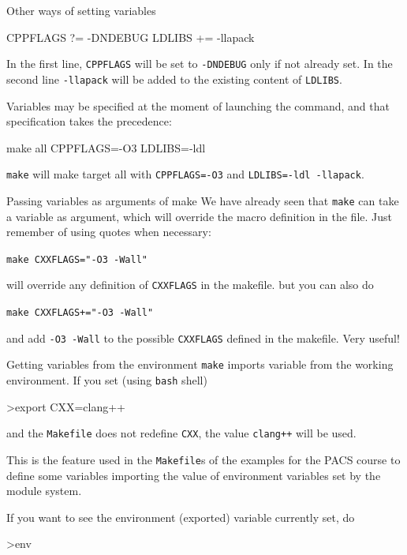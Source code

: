 \documentclass[10pt,aspectratio=169]{beamer}
\begin{document}
\begin{frame}{Other ways of setting variables}
	
	\begin{semiverbatim}
		CPPFLAGS ?= -DNDEBUG\newline
		LDLIBS += -llapack
	\end{semiverbatim}
In the first line, \texttt{CPPFLAGS} will be set to \texttt{-DNDEBUG} only if \alert{not already set}.
In the second line \texttt{-llapack} will be added to the existing content of \texttt{LDLIBS}.
\medskip

Variables may be specified at the moment of launching the command, and that specification takes the precedence:
\begin{semiverbatim}
	make all CPPFLAGS=-O3 LDLIBS=-ldl
\end{semiverbatim}
\texttt{make} will make target \alert{all} with  \texttt{CPPFLAGS=-O3} and \texttt{LDLIBS=-ldl -llapack}.
\end{frame}

\begin{frame}{Passing variables as arguments of make}
    We have already seen that \texttt{make} can take a variable as argument, which will override the macro
    definition in the file.  Just remember of using quotes when necessary:
    
    \begin{center}
        \texttt{make CXXFLAGS="-O3 -Wall"} 
    \end{center}
    will override any definition of \texttt{CXXFLAGS} in the makefile.
    \medskip
    but you can also do
    \begin{center}
        \texttt{make CXXFLAGS+="-O3 -Wall"} 
    \end{center}
    and add \texttt{-O3 -Wall} to the possible \texttt{CXXFLAGS} defined in the makefile.
    \alert{Very useful!}
  \end{frame}


\begin{frame}{Getting variables from the environment}
\texttt{make} imports variable from the working environment. If you set (using \texttt{bash} shell)
\begin{semiverbatim}
    >export CXX=clang++
\end{semiverbatim}
and the \texttt{Makefile} does not redefine \texttt{CXX}, the value \texttt{clang++} will be used.
\smallskip

This is the feature used  in the \texttt{Makefile}s of the examples
for the PACS course to define some variables importing the value of environment variables set by the module system.
\smallskip

If you want to see the environment (exported) variable currently set, do
\begin{semiverbatim}
    >env
\end{semiverbatim}
    
    \end{frame}
\end{document}

